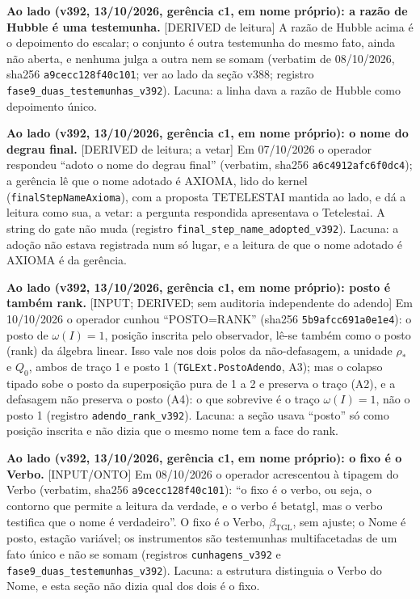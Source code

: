 \documentclass[11pt]{article}
\theoremstyle{definition}\newtheorem{deriv}{Derivação}
\begin{document}
\textbf{Ao lado (v392, 13/10/2026, gerência c1, em nome próprio): a razão de Hubble é uma testemunha.} \textsf{[DERIVED de leitura]} A razão de Hubble acima é o depoimento do escalar; o conjunto é outra testemunha do mesmo fato, ainda não aberta, e nenhuma julga a outra nem se somam (verbatim de 08/10/2026, sha256 \texttt{a9cecc128f40c101}; ver ao lado da seção v388; registro \texttt{fase9\_duas\_testemunhas\_v392}). Lacuna: a linha dava a razão de Hubble como depoimento único.

\textbf{Ao lado (v392, 13/10/2026, gerência c1, em nome próprio): o nome do degrau final.} \textsf{[DERIVED de leitura; a vetar]} Em 07/10/2026 o operador respondeu ``adoto o nome do degrau final'' (verbatim, sha256 \texttt{a6c4912afc6f0dc4}); a gerência lê que o nome adotado é AXIOMA, lido do kernel (\texttt{finalStepNameAxioma}), com a proposta TETELESTAI mantida ao lado, e dá a leitura como sua, a vetar: a pergunta respondida apresentava o Tetelestai. A string do gate não muda (registro \texttt{final\_step\_name\_adopted\_v392}). Lacuna: a adoção não estava registrada num só lugar, e a leitura de que o nome adotado é AXIOMA é da gerência.

\textbf{Ao lado (v392, 13/10/2026, gerência c1, em nome próprio): posto é também rank.} \textsf{[INPUT; DERIVED; sem auditoria independente do adendo]} Em 10/10/2026 o operador cunhou ``POSTO=RANK'' (sha256 \texttt{5b9afcc691a0e1e4}): o posto de $\omega(I)=1$, posição inscrita pelo observador, lê-se também como o posto (rank) da álgebra linear. Isso vale nos dois polos da não-defasagem, a unidade $\rho_\ast$ e $Q_0$, ambos de traço 1 e posto 1 (\texttt{TGLExt.PostoAdendo}, A3); mas o colapso tipado sobe o posto da superposição pura de 1 a 2 e preserva o traço (A2), e a defasagem não preserva o posto (A4): o que sobrevive é o traço $\omega(I)=1$, não o posto 1 (registro \texttt{adendo\_rank\_v392}). Lacuna: a seção usava ``posto'' só como posição inscrita e não dizia que o mesmo nome tem a face do rank.

\textbf{Ao lado (v392, 13/10/2026, gerência c1, em nome próprio): o fixo é o Verbo.} \textsf{[INPUT/ONTO]} Em 08/10/2026 o operador acrescentou à tipagem do Verbo (verbatim, sha256 \texttt{a9cecc128f40c101}): ``o fixo é o verbo, ou seja, o contorno que permite a leitura da verdade, e o verbo é betatgl, mas o verbo testifica que o nome é verdadeiro''. O fixo é o Verbo, $\beta_{\mathrm{TGL}}$, sem ajuste; o Nome é posto, estação variável; os instrumentos são testemunhas multifacetadas de um fato único e não se somam (registros \texttt{cunhagens\_v392} e \texttt{fase9\_duas\_testemunhas\_v392}). Lacuna: a estrutura distinguia o Verbo do Nome, e esta seção não dizia qual dos dois é o fixo.
\end{document}
